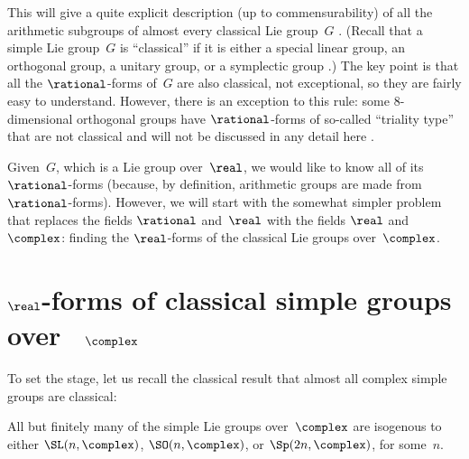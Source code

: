 


\label{ArithClassicalChap}



This  will give a quite explicit description (up to commensurability) of all the arithmetic subgroups of almost every classical Lie group~$G$ . (Recall that a simple Lie group~$G$ is ``classical'' if it is either a special linear group, an orthogonal group, a unitary group, or a symplectic group .) The key point is that all the $\rational$-forms of~$G$ are also classical, not exceptional, so they are fairly easy to understand. 
However, there is an exception to this rule: some $8$-dimensional orthogonal groups have $\rational$-forms of so-called ``triality type'' that are not classical and will not be discussed in any detail here .

Given~$G$, which is a Lie group over~$\real$, we would like to know all of its $\rational$-forms (because, by definition, arithmetic groups are made from $\rational$-forms). However, we will start with the somewhat simpler problem that replaces the fields $\rational$ and~$\real$ with the fields $\real$ and~$\complex$: finding the $\real$-forms of the classical Lie groups over~$\complex$.



\section{\texorpdfstring{$\real$}{R}-forms of classical simple groups over%
\texorpdfstring{~$\complex$}{ C}} \label{RFormsOfCGrps}

To set the stage, let us recall the classical result that almost all complex simple groups are classical:

\begin{thm} \label{AlmostAllOverC}
All but finitely many of the simple Lie groups over\/~$\complex$ are isogenous to either\/ $\SL(n,\complex)$, $\SO(n,\complex)$, or\/ $\Sp(2n,\complex)$, for some~$n$.
\end{thm}


